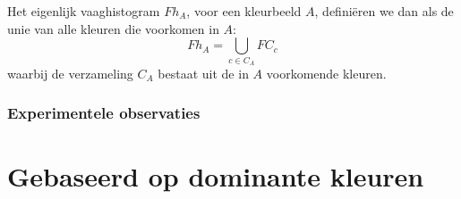 Het eigenlijk vaaghistogram $Fh_A$, voor een kleurbeeld $A$, defini\"eren we dan als de unie van 
alle kleuren die voorkomen in $A$:
$$
Fh_A = \displaystyle\bigcup_{c \in C_A} FC_c
$$ 
waarbij de verzameling $C_A$ bestaat uit de in $A$ voorkomende kleuren.

\subsubsection{Experimentele observaties}


\section{Gebaseerd op dominante kleuren}
